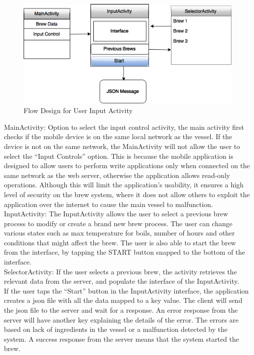 \documentclass{article}
\begin{document}
\begin{figure}[H]
\begin{center}
\includegraphics[scale=0.70]{input-activity.png}
\caption{Flow Design for User Input Activity}
\label{fig:input-activity}
\end{center}
\end{figure}

\noindent MainActivity: Option to select the input control activity, the main activity first checks if the mobile device is on the same local network as the vessel. If the device is not on the same network, the MainActivity will not allow the user to select the ``Input Controls'' option. This is because the mobile application is designed to allow users to perform write applications only when connected on the same network as the web server, otherwise the application allows read-only operations. Although this will limit the application's usability, it ensures a high level of security on the brew system, where it does not allow others to exploit the application over the internet to cause the main vessel to malfunction. \\

\noindent InputActivity: The InputActivity allows the user to select a previous brew process to modify or create a brand new brew process. The user can change various states such as max temperature for boils, number of hours and other conditions that might affect the brew. The user is also able to start the brew from the interface, by tapping the START button snapped to the bottom of the interface. \\

\noindent SelectorActivity: If the user selects a previous brew, the activity retrieves the relevant data from the server, and populate the interface of the InputActivity. \\

If the user taps the ``Start'' button in the InputActivity interface, the application creates a \gls{json} file with all the data mapped to a key value. The client will send the \gls{json} file to the server and wait for a response. An error response from the server will have another key explaining the details of the error. The errors are based on lack of ingredients in the vessel or a malfunction detected by the system. A success response from the server means that the system started the brew.
\end{document}
